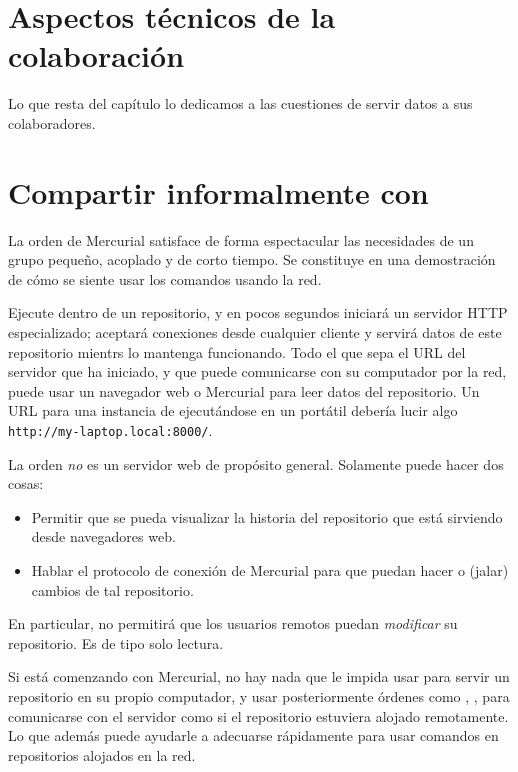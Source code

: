 \section{Aspectos técnicos de la colaboración}

Lo que resta del capítulo lo dedicamos a las cuestiones de servir
datos a sus colaboradores.

\section{Compartir informalmente con }
\label{sec:collab:serve}

La orden  de Mercurial satisface de forma espectacular
las necesidades de un grupo pequeño, acoplado y de corto
tiempo.  Se constituye en una demostración de cómo se siente usar los
comandos usando la red.

Ejecute  dentro de un repositorio, y en pocos segundos
iniciará un servidor HTTP especializado; aceptará conexiones desde
cualquier cliente y servirá datos de este repositorio mientrs lo
mantenga funcionando. Todo el que sepa el URL del servidor que ha
iniciado, y que puede comunicarse con su computador por la red, puede
usar un navegador web o Mercurial para leer datos del repositorio. Un
URL para una instancia de  ejecutándose en un portátil
debería lucir algo \Verb|http://my-laptop.local:8000/|.

La orden  \emph{no} es un servidor web de propósito
general. Solamente puede hacer dos cosas:
\begin{itemize}
\item Permitir que se pueda visualizar la historia del repositorio que
  está sirviendo desde navegadores web.
\item Hablar el protocolo de conexión de Mercurial para que puedan hacer
   o  (jalar) cambios de tal repositorio.
\end{itemize}
En particular,  no permitirá que los usuarios remotos
puedan \emph{modificar} su repositorio.  Es de tipo solo lectura.

Si está comenzando con Mercurial, no hay nada que le impida usar
 para servir un repositorio en su propio computador, y
usar posteriormente órdenes como , , para
comunicarse con el servidor como si el repositorio estuviera alojado
remotamente. Lo que además puede ayudarle a adecuarse rápidamente para
usar comandos en repositorios alojados en la red.

